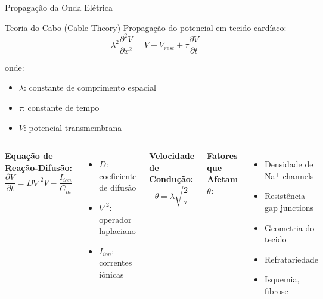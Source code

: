 \begin{frame}{Propagação da Onda Elétrica}
\begin{block}{Teoria do Cabo (Cable Theory)}
Propagação do potencial em tecido cardíaco:
\begin{equation*}
\lambda^2 \frac{\partial^2 V}{\partial x^2} = V - V_{rest} + \tau \frac{\partial V}{\partial t}
\end{equation*}

onde:
\begin{itemize}
    \item $\lambda$: constante de comprimento espacial
    \item $\tau$: constante de tempo
    \item $V$: potencial transmembrana
\end{itemize}
\end{block}

\vspace{0.3cm}

\begin{columns}
\textbf{Equação de Reação-Difusão:}
\begin{equation*}
\frac{\partial V}{\partial t} = D\nabla^2 V - \frac{I_{ion}}{C_m}
\end{equation*}

\begin{itemize}
    \item $D$: coeficiente de difusão
    \item $\nabla^2$: operador laplaciano
    \item $I_{ion}$: correntes iônicas
\end{itemize}

\textbf{Velocidade de Condução:}
\begin{equation*}
\theta = \lambda \sqrt{\frac{2}{\tau}}
\end{equation*}

\vspace{0.3cm}

\textbf{Fatores que Afetam $\theta$:}
\begin{itemize}
    \item Densidade de Na$^+$ channels
    \item Resistência gap junctions
    \item Geometria do tecido
    \item Refratariedade
    \item Isquemia, fibrose
\end{itemize}
\end{columns}
\end{frame}

